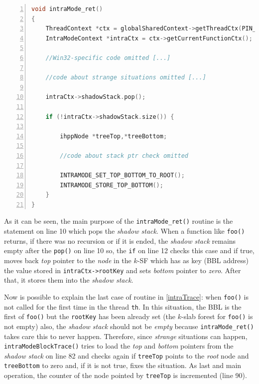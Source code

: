 \documentclass[a4paper,10pt]{report}
\begin{document}
\begin{lstlisting}[language=C++, 
	caption={partial implementation of \texttt{intraMode\_ret()}}, 
	label=intraRet, frame=leftline, numbers=left, showstringspaces=false]
void intraMode_ret() 
{
	ThreadContext *ctx = globalSharedContext->getThreadCtx(PIN_ThreadUid());
	IntraModeContext *intraCtx = ctx->getCurrentFunctionCtx();
	
	//Win32-specific code omitted [...]

	//code about strange situations omitted [...]

	intraCtx->shadowStack.pop();

	if (!intraCtx->shadowStack.size()) {

		ihppNode *treeTop,*treeBottom;

		//code about stack ptr check omitted
	
		INTRAMODE_SET_TOP_BOTTOM_TO_ROOT();
		INTRAMODE_STORE_TOP_BOTTOM();		
	}
}

\end{lstlisting}

\noindent
As it can be seen, the main purpose of the \verb|intraMode_ret()| routine
is the statement on line 10 which pops the \emph{shadow stack}.
When a function like \verb|foo()| returns, if there was no recursion or if it 
is ended, the \emph{shadow stack} remains empty after the \verb|pop()| on line 10 so,
the \verb|if| on line 12 checks this case and if true, moves back
\emph{top} pointer to the \emph{node} in the $k$-SF which 
has as key (BBL address) the value stored in \verb|intraCtx->rootKey| 
and sets \emph{bottom} pointer to \emph{zero}. After that, it stores them
into the \emph{shadow stack}.

Now is possible to explain the last case of routine in \cref{intraTrace}:
when \verb|foo()| is not called for the first time in the thread \verb|th|.
In this situation, the BBL is the first of \verb|foo()| but the \verb|rootKey| 
has been already set (the $k$-slab forest for \verb|foo()| is not empty) also,
the \emph{shadow stack} should not be \emph{empty} because \verb|intraMode_ret()|
takes care this to never happen. 
Therefore, since \emph{strange} situations can happen, \verb|intraModeBlockTrace()|
tries to load the \emph{top} and \emph{bottom} pointers from the \emph{shadow stack}
on line 82 and checks again if \verb|treeTop| points to the \emph{root} node 
and \verb|treeBottom| to zero and, if it is not true, fixes the situation.
As last and main operation, the counter of the node pointed by \verb|treeTop| 
is incremented (line 90).
\end{document}
